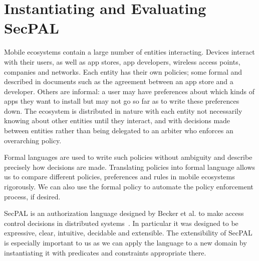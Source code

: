 \documentclass[thesis.tex]{subfiles}
\begin{document}
\chapter{Instantiating and Evaluating SecPAL}
\label{chap:apppal}

Mobile ecosystems contain a large number of entities interacting.
Devices interact with their users, as well as app stores, app developers, wireless access points, companies and networks.
Each entity has their own policies; some formal and described in documents such as the agreement between an app store and a developer.
Others are informal: a user may have preferences about which kinds of apps they want to install but may not go so far as to write these preferences down.
The ecosystem is distributed in nature with each entity not necessarily knowing about other entities until they interact, and with decisions made between entities rather than being delegated to an arbiter who enforces an overarching policy.

Formal languages are used to write such policies without ambiguity and describe precisely how decisions are made.
Translating policies into formal language allows us to compare different policies, preferences and rules in mobile ecosystems rigorously.
We can also use the formal policy to automate the policy enforcement process, if desired.

SecPAL is an authorization language designed by Becker et al{.} to make access control decisions in distributed systems~\cite{becker_secpal:_2010}.
In particular it was designed to be expressive, clear, intuitive, decidable and extensible.
The extensibility of SecPAL is especially important to us as we can apply the language to a new domain by instantiating it with predicates and constraints appropriate there.
\end{document}
